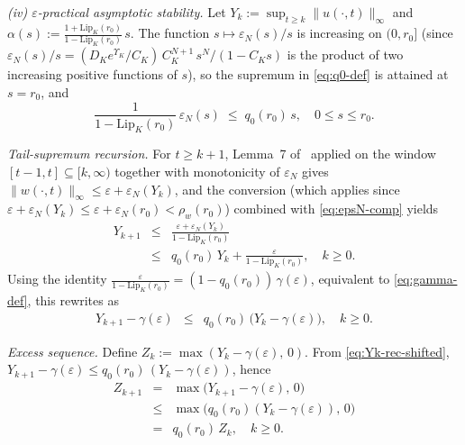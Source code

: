 \documentclass[twocolumn,amsthm]{autart}
\newcommand{\Lipk}{\mathrm{Lip}_K}
\newcommand{\eps}{\varepsilon}
\theoremstyle{plain}
\theoremstyle{definition}
\begin{document}
\emph{(iv) $\eps$-practical asymptotic stability.} Let $Y_k := \sup_{t \ge k}\|u(\cdot,t)\|_\infty$ and $\alpha(s) := \frac{1+\Lipk(r_0)}{1-\Lipk(r_0)}\,s$. The function $s \mapsto \eps_N(s)/s$ is increasing on $(0, r_0]$ (since $\eps_N(s)/s = (D_K e^{\Upsilon_K}/C_K)\,C_K^{N+1}\,s^N/(1 - C_K s)$ is the product of two increasing positive functions of $s$), so the supremum in \eqref{eq:q0-def} is attained at $s = r_0$, and
\begin{equation}
\frac{1}{1-\Lipk(r_0)}\,\eps_N(s) \;\le\; q_0(r_0)\, s, \quad 0 \le s \le r_0.
\label{eq:epsN-comp}
\end{equation}

\emph{Tail-supremum recursion.} For $t \ge k+1$, Lemma~7 of~\cite{krstic2026feedbacklinearizationhyperbolicpdes-trunc} applied on the window $[t-1, t] \subseteq [k, \infty)$ together with monotonicity of $\eps_N$ gives $\|w(\cdot,t)\|_\infty \le \eps + \eps_N(Y_k)$, and the conversion (which applies since $\eps + \eps_N(Y_k) \le \eps + \eps_N(r_0) < \rho_w(r_0)$) combined with \eqref{eq:epsN-comp} yields
\begin{eqnarray}
Y_{k+1} &\le& \frac{\eps + \eps_N(Y_k)}{1-\Lipk(r_0)} \nonumber \\
&\le& q_0(r_0)\, Y_k + \frac{\eps}{1-\Lipk(r_0)}, \quad k \ge 0.
\label{eq:Yk-rec}
\end{eqnarray}
Using the identity $\frac{\eps}{1-\Lipk(r_0)} = (1 - q_0(r_0))\,\gamma(\eps)$, equivalent to \eqref{eq:gamma-def}, this rewrites as
\begin{eqnarray}
Y_{k+1} - \gamma(\eps)
&\le& q_0(r_0)\,\bigl(Y_k - \gamma(\eps)\bigr), \quad k \ge 0.
\label{eq:Yk-rec-shifted}
\end{eqnarray}

\emph{Excess sequence.} Define $Z_k := \max(Y_k - \gamma(\eps),\, 0)$. From \eqref{eq:Yk-rec-shifted}, $Y_{k+1} - \gamma(\eps) \le q_0(r_0)\,(Y_k - \gamma(\eps))$, hence
\begin{eqnarray}
Z_{k+1} &=& \max\bigl(Y_{k+1} - \gamma(\eps),\, 0\bigr) \nonumber \\
&\le& \max\bigl(q_0(r_0)(Y_k - \gamma(\eps)),\, 0\bigr) \nonumber \\
&=& q_0(r_0)\,Z_k, \quad k \ge 0.
\label{eq:Zk-rec}
\end{eqnarray}
\end{document}
